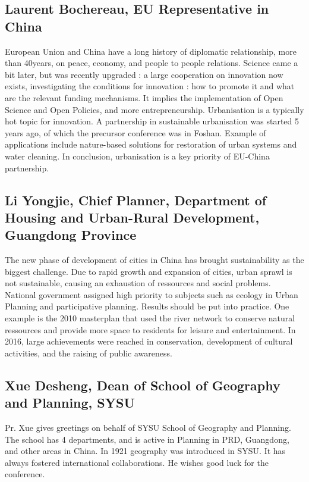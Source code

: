 \documentclass[10pt]{article}
\begin{document}
\subsection*{Laurent Bochereau, EU Representative in China}

European Union and China have a long history of diplomatic relationship, more than 40years, on peace, economy, and people to people relations. Science came a bit later, but was recently upgraded : a large cooperation on innovation now exists, investigating the conditions for innovation : how to promote it and what are the relevant funding mechanisms. It implies the implementation of Open Science and Open Policies, and more entrepreneurship. Urbanisation is a typically hot topic for innovation. A partnership in sustainable urbanisation was started 5 years ago, of which the precursor conference was in Foshan. Example of applications include nature-based solutions for restoration of urban systems and water cleaning. In conclusion, urbanisation is a key priority of EU-China partnership.


\subsection*{Li Yongjie, Chief Planner, Department of Housing and Urban-Rural Development, Guangdong Province}

The new phase of development of cities in China has brought sustainability as the biggest challenge. Due to rapid growth and expansion of cities, urban sprawl is not sustainable, causing an exhaustion of ressources and social problems. National government assigned high priority to subjects such as ecology in Urban Planning and participative planning. Results should be put into practice. One example is the 2010 masterplan that used the river network to conserve natural ressources and provide more space to residents for leisure and entertainment. In 2016, large achievements were reached in conservation, development of cultural activities, and the raising of public awareness. 



\subsection*{Xue Desheng, Dean of School of Geography and Planning, SYSU}

Pr. Xue gives greetings on behalf of SYSU School of Geography and Planning. The school has 4 departments, and is active in Planning in PRD, Guangdong, and other areas in China. In 1921 geography was introduced in SYSU. It has always fostered international collaborations. He wishes good luck for the conference.
\end{document}
